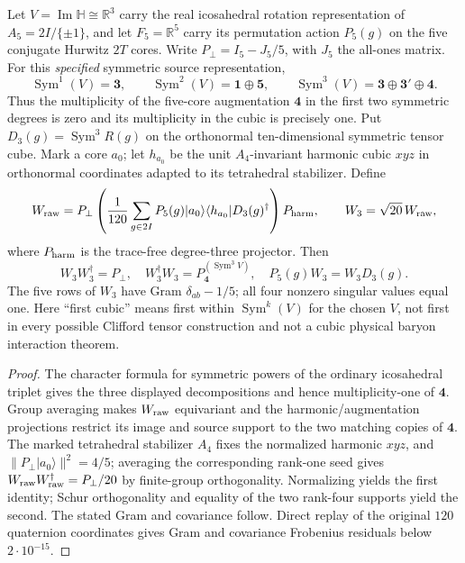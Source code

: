 \documentclass[11pt]{article}
\begin{document}
\begin{theorem}
\label{p1b:thm:v369-five-core-cubic-intertwiner}
Let $V=\operatorname{Im}\mathbb H\cong\mathbb R^3$ carry the real
icosahedral rotation representation of $A_5=2I/\{\pm1\}$, and let
$F_5=\mathbb R^5$ carry its permutation action $P_5(g)$ on the five
conjugate Hurwitz $2T$ cores.  Write
$P_\perp=I_5-J_5/5$, with $J_5$ the all-ones matrix.  For this
\emph{specified} symmetric source representation,
\[
 \operatorname{Sym}^1(V)=\mathbf3,\qquad
 \operatorname{Sym}^2(V)=\mathbf1\oplus\mathbf5,\qquad
 \operatorname{Sym}^3(V)=\mathbf3\oplus\mathbf3'\oplus\mathbf4.
\]
Thus the multiplicity of the five-core augmentation $\mathbf4$ in the
first two symmetric degrees is zero and its multiplicity in the cubic
is precisely one.  Put $D_3(g)=\operatorname{Sym}^3R(g)$ on the
orthonormal ten-dimensional symmetric tensor cube.  Mark a core $a_0$;
let $h_{a_0}$ be the unit $A_4$-invariant harmonic cubic $xyz$ in
orthonormal coordinates adapted to its tetrahedral stabilizer.  Define
\[
 W_{\rm raw}=P_\perp\left({1\over120}\sum_{g\in2I}
 P_5(g)|a_0\rangle\langle h_{a_0}|D_3(g)^\dagger\right)
 P_{\rm harm},\qquad W_3=\sqrt{20}\,W_{\rm raw},
\]
where $P_{\rm harm}$ is the trace-free degree-three projector.  Then
\[
 \boxed{W_3W_3^\dagger=P_\perp,\quad
 W_3^\dagger W_3=P_{\mathbf4}^{(\operatorname{Sym}^3V)},\quad
 P_5(g)W_3=W_3D_3(g).}
\]
The five rows of $W_3$ have Gram $\delta_{ab}-1/5$; all four
nonzero singular values equal one.  Here ``first cubic'' means first
within $\operatorname{Sym}^k(V)$ for the chosen $V$, not first in every
possible Clifford tensor construction and not a cubic physical baryon
interaction theorem.
\end{theorem}
\begin{proof}
The character formula for symmetric powers of the ordinary
icosahedral triplet gives the three displayed decompositions and hence
multiplicity-one of $\mathbf4$.  Group averaging makes $W_{\rm raw}$
equivariant and the harmonic/augmentation projections restrict its
image and source support to the two matching copies of $\mathbf4$.
The marked tetrahedral stabilizer $A_4$ fixes the normalized harmonic
$xyz$, and $\|P_\perp|a_0\rangle\|^2=4/5$; averaging the corresponding
rank-one seed gives $W_{\rm raw}W_{\rm raw}^\dagger=P_\perp/20$
by finite-group orthogonality.  Normalizing yields the first identity;
Schur orthogonality and equality of the two rank-four supports yield
the second.  The stated Gram and covariance follow.  Direct replay of
the original $120$ quaternion coordinates gives Gram and covariance
Frobenius residuals below $2\cdot10^{-15}$.
\end{proof}
\end{document}
